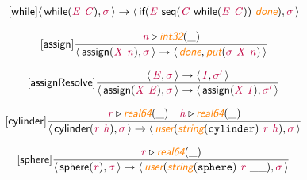 \documentclass[10pt,leqno,fleqn]{article}
\newcommand{\artVariable}[1]{\mbox{\color{purple}\em #1\/}}
\newcommand{\artConstructor}[1]{\mbox{\sf #1}}
\newcommand{\artCaseInsensitiveLiteral}[1]{\mbox{\tt #1}}
\newcommand{\artSpecial}[1]{\mbox{\color{orange}\sf\em #1}}
\begin{document}
\begin{equation}
\tag*{[\artConstructor{\sf while}]}
\begin{split}\langle\, \artConstructor{\sf while}(\artVariable{E}\ \artVariable{C}), \artVariable{$\sigma$}\,\rangle \rightarrow \langle\, \artConstructor{\sf if}(\artVariable{E}\ \artConstructor{\sf seq}(\artVariable{C}\ \artConstructor{\sf while}(\artVariable{E}\ \artVariable{C}))\ \artSpecial{done}), \artVariable{$\sigma$}\,\rangle 
\end{split}
\end{equation}

\begin{equation}
\tag*{[\artConstructor{\sf assign}]}
\begin{split}\frac{ \artVariable{n}\triangleright \artSpecial{int32}(\_) }{\langle\, \artConstructor{\sf assign}(\artVariable{X}\ \artVariable{n}), \artVariable{$\sigma$}\,\rangle \rightarrow \langle\, \artSpecial{done}, \artSpecial{put}(\artVariable{$\sigma$}\ \artVariable{X}\ \artVariable{n})\,\rangle }
\end{split}
\end{equation}

\begin{equation}
\tag*{[\artConstructor{\sf assignResolve}]}
\begin{split}\frac{\langle\, \artVariable{E}, \artVariable{$\sigma$}\,\rangle \rightarrow \langle\, \artVariable{I}, \artVariable{$\sigma$\/$^\prime$}\,\rangle }{\langle\, \artConstructor{\sf assign}(\artVariable{X}\ \artVariable{E}), \artVariable{$\sigma$}\,\rangle \rightarrow \langle\, \artConstructor{\sf assign}(\artVariable{X}\ \artVariable{I}), \artVariable{$\sigma$\/$^\prime$}\,\rangle }
\end{split}
\end{equation}

\begin{equation}
\tag*{[\artConstructor{\sf cylinder}]}
\begin{split}\frac{ \artVariable{r}\triangleright \artSpecial{real64}(\_) \quad  \artVariable{h}\triangleright \artSpecial{real64}(\_) }{\langle\, \artConstructor{\sf cylinder}(\artVariable{r}\ \artVariable{h}), \artVariable{$\sigma$}\,\rangle \rightarrow \langle\, \artSpecial{user}(\artSpecial{string}(\artCaseInsensitiveLiteral{cylinder})\ \artVariable{r}\ \artVariable{h}), \artVariable{$\sigma$}\,\rangle }
\end{split}
\end{equation}

\begin{equation}
\tag*{[\artConstructor{\sf sphere}]}
\begin{split}\frac{ \artVariable{r}\triangleright \artSpecial{real64}(\_) }{\langle\, \artConstructor{\sf sphere}(\artVariable{r}), \artVariable{$\sigma$}\,\rangle \rightarrow \langle\, \artSpecial{user}(\artSpecial{string}(\artCaseInsensitiveLiteral{sphere})\ \artVariable{r}\ \_\_), \artVariable{$\sigma$}\,\rangle }
\end{split}
\end{equation}
\end{document}
